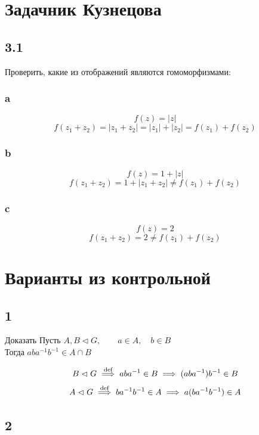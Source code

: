 \section{Задачник Кузнецова}

\subsection{3.1}

Проверить, какие из отображений являются гомоморфизмами:

\subsubsection{a}

$$ f(z) = |z| $$
$$ f(z_1 + z_2) = |z_1 + z_2| = |z_1| + |z_2| = f(z_1) + f(z_2) $$

\subsubsection{b}

$$ f(z) = 1 + |z| $$
$$ f(z_1 + z_2) = 1 + |z_1 + z_2| \ne f(z_1) + f(z_2) $$

\subsubsection{c}

$$ f(z) = 2 $$
$$ f(z_1 + z_2) = 2 \ne f(z_1) + f(z_2) $$

\section{Варианты из контрольной}

\subsection{1}

\begin{undefthm}{Доказать}
	Пусть $ A, B \vartriangleleft G, \qquad a \in A, \quad b \in B $ \\
    Тогда $ aba^{-1}b^{-1} \in A \cap B $
\end{undefthm}

$$ B \vartriangleleft G \bydef[\implies] aba^{-1} \in B \implies (aba^{-1})b^{-1} \in B $$
$$ A \vartriangleleft G \bydef[\implies] ba^{-1}b^{-1} \in A \implies a(ba^{-1}b^{-1}) \in A $$

\subsection{2}

